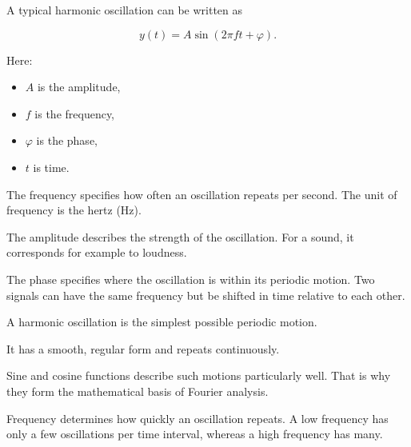 A typical harmonic oscillation can be written as

\[
y(t)=A\sin(2\pi f t+\varphi).
\]

Here:

\begin{itemize}
	\item $A$ is the amplitude,
	\item $f$ is the frequency,
	\item $\varphi$ is the phase,
	\item $t$ is time.
\end{itemize}

The frequency specifies
how often an oscillation repeats per second.
The unit of frequency is the hertz (Hz).

The amplitude describes the strength of the oscillation.
For a sound, it corresponds for example to loudness.

The phase specifies
where the oscillation is within its periodic motion.
Two signals can have the same frequency
but be shifted in time relative to each other.

\begin{DidacticBox}
	\small
	\label{box:fourier-harmonische-schwingung}
	A harmonic oscillation is the simplest possible periodic motion.
	
	It has a smooth,
	regular form
	and repeats continuously.
	
	Sine and cosine functions describe such motions particularly well.
	That is why they form the mathematical basis of Fourier analysis.
\end{DidacticBox}


Frequency determines
how quickly an oscillation repeats.
A low frequency has only a few oscillations per time interval,
whereas a high frequency has many.

